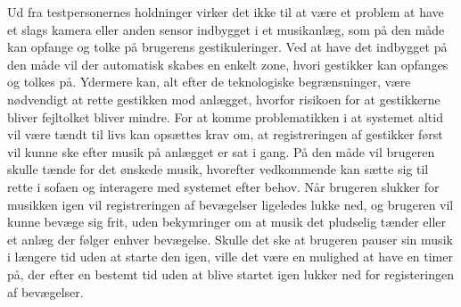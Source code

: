 Ud fra testpersonernes holdninger virker det ikke til at være et problem at have et slags kamera eller anden sensor indbygget i et musikanlæg, som på den måde kan opfange og tolke på brugerens gestikuleringer. Ved at have det indbygget på den måde vil der automatisk skabes en enkelt zone, hvori gestikker kan opfanges og tolkes på. Ydermere kan, alt efter de teknologiske begrænsninger, være nødvendigt at rette gestikken mod anlægget, hvorfor risikoen for at gestikkerne bliver fejltolket bliver mindre. For at komme problematikken i at systemet altid vil være tændt til livs kan opsættes krav om, at registreringen af gestikker først vil kunne ske efter musik på anlægget er sat i gang. På den måde vil brugeren skulle tænde for det ønskede musik, hvorefter vedkommende kan sætte sig til rette i sofaen og interagere med systemet efter behov. Når brugeren slukker for musikken igen vil registreringen af bevægelser ligeledes lukke ned, og brugeren vil kunne bevæge sig frit, uden bekymringer om at musik det pludselig tænder eller et anlæg der følger enhver bevægelse. Skulle det ske at brugeren pauser sin musik i længere tid uden at starte den igen, ville det være en mulighed at have en timer på, der efter en bestemt tid uden at blive startet igen lukker ned for registeringen af bevægelser.  
